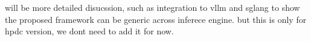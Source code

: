 will be more detailed disucssion, such as integration to vllm and sglang to show the proposed framework can be generic across inferece engine. but this is only for hpdc version, we dont need to add it for now.